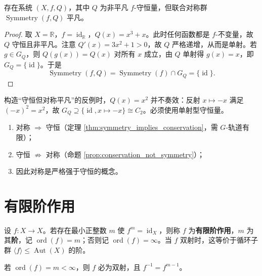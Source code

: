 \begin{proposition}[守恒不蕴含对称]\label{prop:conservation_not_symmetry}
存在系统 $(X,f,Q)$，其中 $Q$ 为非平凡 $f$-守恒量，但联合对称群 $\operatorname{Symmetry}(f,Q)$ 平凡。
\end{proposition}

\begin{proof}
取 $X=\mathbb{R}$，$f=\operatorname{id}_{\mathbb{R}}$，$Q(x)=x^3+x$。此时任何函数都是 $f$-不变量，故 $Q$ 守恒且非平凡。注意 $Q'(x)=3x^2+1>0$，故 $Q$ 严格递增，从而是单射。若 $g\in G_Q$，则 $Q(g(x))=Q(x)$ 对所有 $x$ 成立，由 $Q$ 单射得 $g(x)=x$，即 $G_Q=\{\operatorname{id}\}$。于是
\[
\operatorname{Symmetry}(f,Q)=\operatorname{Symmetry}(f)\cap G_Q=\{\operatorname{id}\}.
\]
\end{proof}

\begin{remark}[反例构造中的反射陷阱]\label{rem:counterexample_fix}
构造“守恒但对称平凡”的反例时，$Q(x)=x^2$ 并不奏效：反射 $x\mapsto -x$ 满足 $(-x)^2=x^2$，故 $G_Q\supseteq\{\operatorname{id},x\mapsto -x\}\cong C_2$。必须使用单射型守恒量。
\end{remark}

\begin{corollary}[守恒与对称的逻辑层次]\label{cor:conservation_symmetry_hierarchy}
\begin{enumerate}[label=(\roman*)]
    \item 对称 $\Rightarrow$ 守恒（定理 \ref{thm:symmetry_implies_conservation}，需 $G$-轨道有限）；
    \item 守恒 $\nRightarrow$ 对称（命题 \ref{prop:conservation_not_symmetry}）；
    \item 因此对称是严格强于守恒的概念。
\end{enumerate}
\end{corollary}

\section{有限阶作用}

\begin{definition}[映射的阶]\label{def:map_order}
设 $f:X\to X$。若存在最小正整数 $m$ 使 $f^m=\operatorname{id}_X$，则称 $f$ 为\textbf{有限阶作用}，$m$ 为其\textbf{阶}，记 $\operatorname{ord}(f)=m$；否则记 $\operatorname{ord}(f)=\infty$。当 $f$ 双射时，这等价于循环子群 $\langle f\rangle\le\operatorname{Aut}(X)$ 的阶。
\end{definition}

\begin{lemma}[有限阶蕴含可逆]\label{lem:finite_order_bijective}
若 $\operatorname{ord}(f)=m<\infty$，则 $f$ 必为双射，且 $f^{-1}=f^{m-1}$。
\end{lemma}

